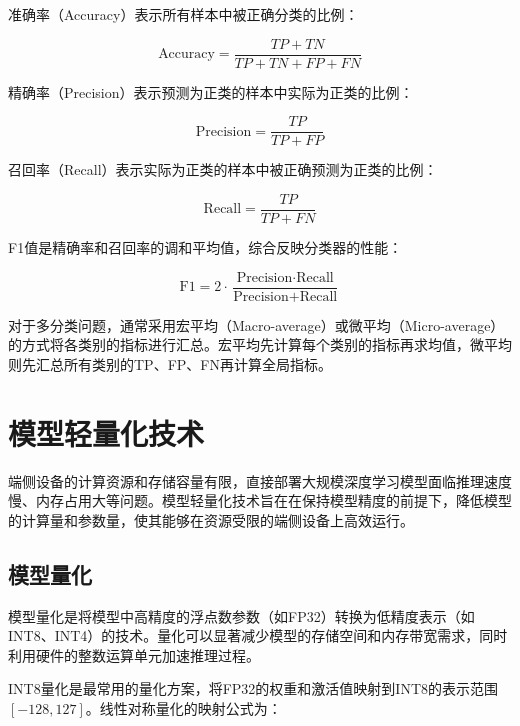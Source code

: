 准确率（Accuracy）表示所有样本中被正确分类的比例：

\begin{equation}
	\text{Accuracy} = \frac{TP + TN}{TP + TN + FP + FN}
	\label{eq:accuracy}
\end{equation}

精确率（Precision）表示预测为正类的样本中实际为正类的比例：

\begin{equation}
	\text{Precision} = \frac{TP}{TP + FP}
	\label{eq:precision}
\end{equation}

召回率（Recall）表示实际为正类的样本中被正确预测为正类的比例：

\begin{equation}
	\text{Recall} = \frac{TP}{TP + FN}
	\label{eq:recall}
\end{equation}

F1值是精确率和召回率的调和平均值，综合反映分类器的性能：

\begin{equation}
	\text{F1} = 2 \cdot \frac{\text{Precision} \cdot \text{Recall}}{\text{Precision} + \text{Recall}}
	\label{eq:f1}
\end{equation}

对于多分类问题，通常采用宏平均（Macro-average）或微平均（Micro-average）的方式将各类别的指标进行汇总。宏平均先计算每个类别的指标再求均值，微平均则先汇总所有类别的TP、FP、FN再计算全局指标。

\section{模型轻量化技术}

端侧设备的计算资源和存储容量有限，直接部署大规模深度学习模型面临推理速度慢、内存占用大等问题。模型轻量化技术旨在在保持模型精度的前提下，降低模型的计算量和参数量，使其能够在资源受限的端侧设备上高效运行\cite{han2015deep}。

\subsection{模型量化}

模型量化是将模型中高精度的浮点数参数（如FP32）转换为低精度表示（如INT8、INT4）的技术\cite{jacob2018quantization}。量化可以显著减少模型的存储空间和内存带宽需求，同时利用硬件的整数运算单元加速推理过程。

INT8量化是最常用的量化方案，将FP32的权重和激活值映射到INT8的表示范围$[-128, 127]$。线性对称量化的映射公式为：

